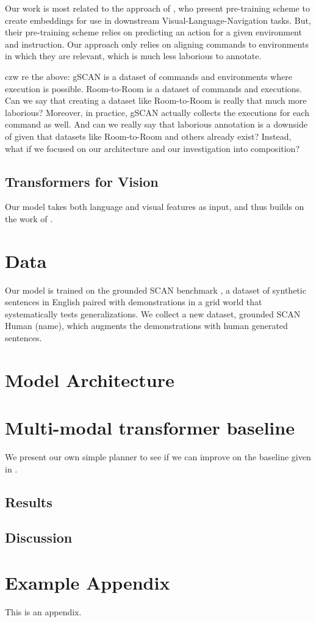 \documentclass[11pt]{article}
\begin{document}
%
Our work is most related to the approach of \citet{Hao2020TowardsLA}, who present pre-training scheme to create embeddings for use in downstream Visual-Language-Navigation tasks.
%
But, their pre-training scheme relies on predicting an action for a given environment and instruction.
%
Our approach only relies on aligning commands to environments in which they are relevant, which is much less laborious to annotate.
%

{\color{red}czw re the above: gSCAN is a dataset of commands and environments where execution is possible. Room-to-Room is a dataset of commands and executions. 
%
Can we say that creating a dataset like Room-to-Room is really that much more laborious? 
%
Moreover, in practice, gSCAN actually collects the executions for each command as well. 
%
And can we really say that laborious annotation is a downside of \citet{Hao2020TowardsLA} given that datasets like Room-to-Room and others already exist?
%
Instead, what if we focused on our architecture and our investigation into composition?}
%

\subsection{Transformers for Vision}
Our model takes both language and visual features as input, and thus builds on the work of \citep{LuViLBERT2019, tan-bansal-2019-lxmert, LiVisualBert2019}.



\section{Data}
Our model is trained on the grounded SCAN benchmark \citep{ruis2020benchmark}, a dataset of synthetic sentences in English paired with demonstrations in a grid world that systematically tests generalizations.
%
We collect a new dataset, grounded SCAN Human (\TODO name), which augments the demonstrations with human generated sentences.
%


\section{Model Architecture}

\section{Multi-modal transformer baseline}
We present our own simple planner to see if we can improve on the baseline given in \cite{ruis2020benchmark}.

\subsection{Results}

\subsection{Discussion}






\appendix

\section{Example Appendix}
\label{sec:appendix}

This is an appendix.
\end{document}
